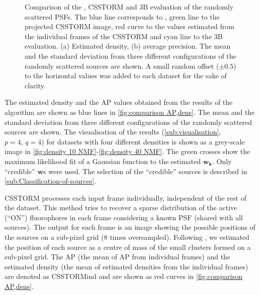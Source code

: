 \begin{figure}[!h]
	\centering
	\newcommand{\sizef}{.38}
	
	\caption{Comparison of the \inmf{}, CSSTORM and 3B evaluation of the randomly scattered PSFs. The blue line corresponds to \inmf{}, green line to the projected CSSTORM image, red curve to the values estimated from the individual frames of the CSSTORM and cyan line to the 3B evaluation. (a) Estimated density, (b) average precision. The mean and the standard deviation from three different configurations of the randomly scattered sources are shown. A small random offset ($\pm0.5$) to the horizontal values was added to each dataset for the sake of clarity.}
	\label{fig:comparison AP,dens}
\end{figure}
%
The estimated density and the AP values obtained from the results of the \inmf{} algorithm are shown as blue lines in \autoref{fig:comparison AP,dens}. The mean and the standard deviation from three different configurations of the randomly scattered sources are shown. The visualisation of the results (\autoref{sub:visualisation}, $p=4,\,q=4$) for datasets with four different densities is shown as a grey-scale image in \autoref{fig:density 10 NMF}-\ref{fig:density 40 NMF}. The green crosses show the maximum likelihood fit of a Gaussian function to the \inmf{} estimated $\bm{w_k}$. Only ``credible'' $\bm{w}$s were used. The selection of the ``credible'' sources is described in \autoref{sub:Classification-of-sources}.

CSSTORM processes each input frame individually, independent of the rest of the dataset. This method tries to recover a sparse distribution of the active (``ON'') fluorophores in each frame considering a known PSF (shared with all sources). The output for each frame is an image showing the possible positions of the sources on a sub-pixel grid (8 times oversampled). Following \cite{Zhu2012}, we estimated the position of each source as a centre of mass of the small clusters formed on a sub-pixel grid. The AP (the mean of AP from individual frames) and the estimated density (the mean of estimated densities from the individual frames) are denoted as \textsf{CSSTORMind} and are shown as red curves in \autoref{fig:comparison AP,dens}. 

